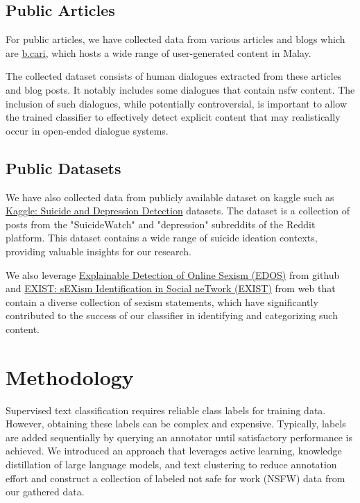 \documentclass[preprint]{article}
\begin{document}
\subsection{Public Articles}

For public articles, we have collected data from various articles and blogs which are \href{http://b.cari.com.my}{b.cari}, which hosts a wide range of user-generated content in Malay.

The collected dataset consists of human dialogues extracted from these articles and blog posts. It notably includes some dialogues that contain nsfw content. The inclusion of such dialogues, while potentially controversial, is important to allow the trained classifier to effectively detect explicit content that may realistically occur in open-ended dialogue systems.

\subsection{Public Datasets}

We have also collected data from publicly available dataset on kaggle such as \href{https://www.kaggle.com/datasets/nikhileswarkomati/suicide-watch}{Kaggle: Suicide and Depression Detection} datasets. The dataset is a collection of posts from the "SuicideWatch" and "depression" subreddits of the Reddit platform. This dataset contains a wide range of suicide ideation contexts, providing valuable insights for our research.

We also leverage \href{https://github.com/rewire-online/edos}{Explainable Detection of Online Sexism (EDOS)} from github and \href{http://nlp.uned.es/exist2021/}{EXIST: sEXism Identification in Social neTwork (EXIST)} from web that contain a diverse collection of sexism statements, which have significantly contributed to the success of our classifier in identifying and categorizing such content.

\section{Methodology}

Supervised text classification requires reliable class labels for training data. However, obtaining these labels can be complex and expensive. Typically, labels are added sequentially by querying an annotator until satisfactory performance is achieved. We introduced an approach that leverages active learning, knowledge distillation of large language models, and text clustering to reduce annotation effort and construct a collection of labeled not safe for work (NSFW) data from our gathered data.
\end{document}

